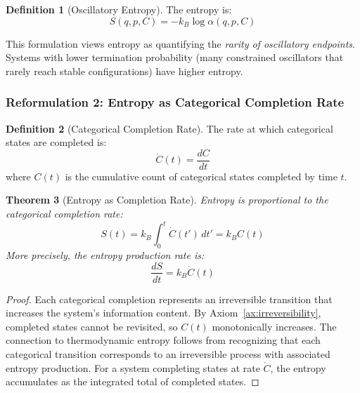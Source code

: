 \documentclass[twocolumn,superscriptaddress,prb,10pt]{revtex4-2}
\newtheorem{theorem}{Theorem}
\theoremstyle{definition}
\newtheorem{definition}[theorem]{Definition}
\theoremstyle{remark}
\begin{document}
\begin{definition}[Oscillatory Entropy]
\label{def:entropy}
The entropy is:
\begin{equation}
S(q,p,C) = -k_B \log \alpha(q,p,C)
\label{eq:oscillatory_entropy}
\end{equation}
\end{definition}

This formulation views entropy as quantifying the \emph{rarity of oscillatory endpoints}. Systems with lower termination probability (many constrained oscillators that rarely reach stable configurations) have higher entropy.

\subsubsection{Reformulation 2: Entropy as Categorical Completion Rate}

\begin{definition}[Categorical Completion Rate]
\label{def:completion_rate}
The rate at which categorical states are completed is:
\begin{equation}
\dot{C}(t) = \frac{dC}{dt}
\label{eq:completion_rate}
\end{equation}
where $C(t)$ is the cumulative count of categorical states completed by time $t$.
\end{definition}

\begin{theorem}[Entropy as Completion Rate]
\label{thm:entropy_rate}
Entropy is proportional to the categorical completion rate:
\begin{equation}
S(t) = k_B \int_0^t \dot{C}(t') \, dt' = k_B C(t)
\label{eq:entropy_completion_rate}
\end{equation}
More precisely, the entropy production rate is:
\begin{equation}
\frac{dS}{dt} = k_B \dot{C}(t)
\label{eq:entropy_production_rate}
\end{equation}
\end{theorem}

\begin{proof}
Each categorical completion represents an irreversible transition that increases the system's information content. By Axiom~\ref{ax:irreversibility}, completed states cannot be revisited, so $C(t)$ monotonically increases. The connection to thermodynamic entropy follows from recognizing that each categorical transition corresponds to an irreversible process with associated entropy production. For a system completing states at rate $\dot{C}$, the entropy accumulates as the integrated total of completed states.
\end{proof}
\end{document}

